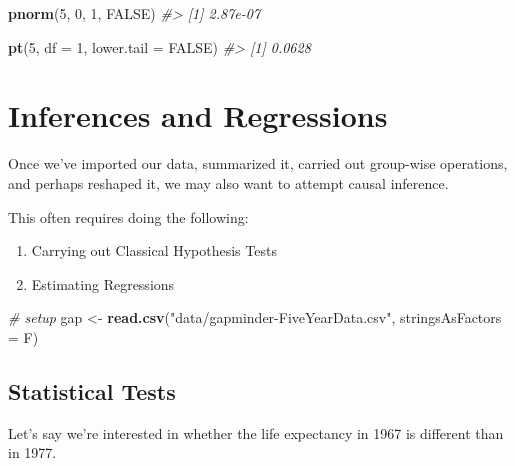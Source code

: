 \documentclass[]{book}
\newenvironment{Shaded}{\begin{snugshade}}{\end{snugshade}}
\newcommand{\CommentTok}[1]{\textcolor[rgb]{0.56,0.35,0.01}{\textit{#1}}}
\newcommand{\DataTypeTok}[1]{\textcolor[rgb]{0.13,0.29,0.53}{#1}}
\newcommand{\DecValTok}[1]{\textcolor[rgb]{0.00,0.00,0.81}{#1}}
\newcommand{\FloatTok}[1]{\textcolor[rgb]{0.00,0.00,0.81}{#1}}
\newcommand{\KeywordTok}[1]{\textcolor[rgb]{0.13,0.29,0.53}{\textbf{#1}}}
\newcommand{\NormalTok}[1]{#1}
\newcommand{\OperatorTok}[1]{\textcolor[rgb]{0.81,0.36,0.00}{\textbf{#1}}}
\newcommand{\OtherTok}[1]{\textcolor[rgb]{0.56,0.35,0.01}{#1}}
\newcommand{\StringTok}[1]{\textcolor[rgb]{0.31,0.60,0.02}{#1}}
\providecommand{\tightlist}{%
  \setlength{\itemsep}{0pt}\setlength{\parskip}{0pt}}
\begin{document}
\begin{Shaded}
\begin{Highlighting}[]
\KeywordTok{pnorm}\NormalTok{(}\DecValTok{5}\NormalTok{, }\DecValTok{0}\NormalTok{, }\DecValTok{1}\NormalTok{, }\OtherTok{FALSE}\NormalTok{)}
\CommentTok{#> [1] 2.87e-07}

\KeywordTok{pt}\NormalTok{(}\DecValTok{5}\NormalTok{, }\DataTypeTok{df =} \DecValTok{1}\NormalTok{, }\DataTypeTok{lower.tail =} \OtherTok{FALSE}\NormalTok{)}
\CommentTok{#> [1] 0.0628}
\end{Highlighting}
\end{Shaded}

\hypertarget{inferences-and-regressions}{%
\section{Inferences and Regressions}\label{inferences-and-regressions}}

Once we've imported our data, summarized it, carried out group-wise operations, and perhaps reshaped it, we may also want to attempt causal inference.

This often requires doing the following:

\begin{enumerate}
\def\labelenumi{\arabic{enumi})}
\tightlist
\item
  Carrying out Classical Hypothesis Tests
\item
  Estimating Regressions
\end{enumerate}

\begin{Shaded}
\begin{Highlighting}[]
\CommentTok{# setup}
\NormalTok{gap <-}\StringTok{ }\KeywordTok{read.csv}\NormalTok{(}\StringTok{"data/gapminder-FiveYearData.csv"}\NormalTok{, }\DataTypeTok{stringsAsFactors =}\NormalTok{ F)}
\end{Highlighting}
\end{Shaded}

\hypertarget{statistical-tests}{%
\subsection{Statistical Tests}\label{statistical-tests}}

Let's say we're interested in whether the life expectancy in 1967 is different than in 1977.

\begin{Shaded}
\end{Shaded}
\end{document}

